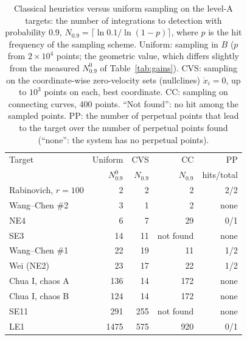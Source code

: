 
\begin{table}
\caption{Classical heuristics versus uniform sampling on the level-A targets: the number of integrations to detection with probability 0.9, $N_{0.9}=\lceil\ln0.1/\ln(1-p)\rceil$, where $p$ is the hit frequency of the sampling scheme. Uniform: sampling in $B$ ($p$ from $2\times10^4$ points; the geometric value, which differs slightly from the measured $N^0_{0.9}$ of Table~\ref{tab:gains}). CVS: sampling on the coordinate-wise zero-velocity sets (nullclines) $\dot x_i=0$, up to $10^3$ points on each, best coordinate. CC: sampling on connecting curves, 400 points. ``Not found'': no hit among the sampled points. PP: the number of perpetual points that lead to the target over the number of perpetual points found (``none'': the system has no perpetual points).}
\label{tab:classic}
\footnotesize
\setlength{\tabcolsep}{3pt}
\begin{ruledtabular}
\begin{tabular}{lrrrr}
Target & Uniform & CVS & CC & PP \\
 & $N^0_{0.9}$ & $N_{0.9}$ & $N_{0.9}$ & hits/total \\
\hline
Rabinovich, $r=100$ & 2 & 2 & 2 & 2/2 \\
Wang--Chen \#2 & 3 & 1 & 2 & none \\
NE4 & 6 & 7 & 29 & 0/1 \\
SE3 & 14 & 11 & not found & none \\
Wang--Chen \#1 & 22 & 19 & 11 & 1/2 \\
Wei (NE2) & 23 & 17 & 22 & 1/2 \\
Chua I, chaos A\footnotemark[1] & 136 & 14 & 172 & none \\
Chua I, chaos B\footnotemark[1] & 124 & 14 & 172 & none \\
SE11 & 291 & 255 & not found & none \\
LE1 & 1475 & 575 & 920 & 0/1 \\
\end{tabular}
\end{ruledtabular}
\end{table}
